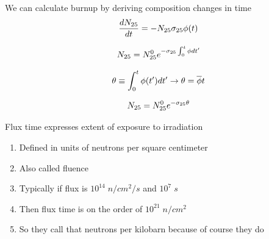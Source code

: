 \documentclass[aspectratio=1610,pdftex,dvipsnames,compress,xcolor={dvipsnames}]{beamer}
\begin{document}
\begin{frame}{We can calculate burnup by deriving composition changes in time}
    \begin{equation}
        \LARGE
        \frac{dN_{25}}{dt}=-N_{25}\sigma_{25}\phi(t)
    \end{equation}
    
    \begin{equation}
        \LARGE
        N_{25}=N_{25}^0e^{-\sigma_{25}\int_0^t\phi dt'}
    \end{equation}
    
    \begin{equation}
        \LARGE
        \theta \equiv \int_0^t\phi(t')dt'\rightarrow \theta = \overline{\phi} t
    \end{equation}

    \begin{equation}
        \LARGE
        N_{25}=N_{25}^0e^{-\sigma_{25}\theta}
    \end{equation}
\end{frame}


\begin{frame}{Flux time expresses extent of exposure to irradiation}
    \begin{enumerate}[series=outerlist,topsep=0pt,itemsep=21pt,leftmargin=*,label=(\arabic*)]
        \item[]Defined in units of neutrons per square centimeter
        \item[]Also called fluence
        \item[]Typically if flux is $10^{14} \; n/cm^2/s$ and $10^7 \; s$
        \item[]Then flux time is on the order of $10^{21} \; n/cm^2$
        \item[]So they call that neutrons per kilobarn because of course they do
    \end{enumerate}
\end{frame}
\end{document}
